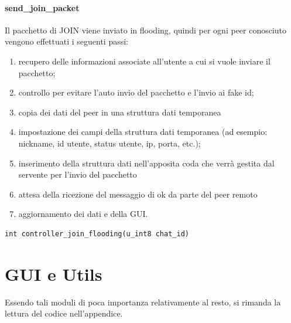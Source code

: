 \paragraph{send\_join\_packet}
Il pacchetto di JOIN viene inviato in flooding, quindi per ogni peer conosciuto vengono effettuati i seguenti passi:
\begin{enumerate}
\item recupero delle informazioni associate all'utente a cui si vuole inviare il pacchetto;
\item controllo per evitare l'auto invio del pacchetto e l'invio ai fake id;
\item copia dei dati del peer in una struttura dati temporanea
\item impostazione dei campi della struttura dati temporanea (ad esempio: nickname, id utente, status utente, ip, porta, etc.);
\item inserimento della struttura dati nell'apposita coda che verrà gestita dal servente per l'invio del pacchetto
\item attesa della ricezione del messaggio di ok da parte del peer remoto
\item aggiornamento dei dati e della GUI.
\end{enumerate}
\begin{lstlisting}
int controller_join_flooding(u_int8 chat_id)
\end{lstlisting}
\section{GUI e Utils}
Essendo tali moduli di poca importanza relativamente al resto, si rimanda la lettura del codice nell'appendice.